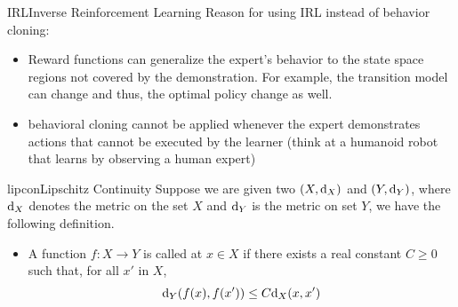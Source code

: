 \documentclass[9pt]{article}
\begin{document}
\begin{topic}{IRL}{Inverse Reinforcement Learning} 
Reason for using IRL instead of behavior cloning:
\begin{itemize}
\item Reward functions can generalize the expert's behavior to the state space regions not covered by the demonstration. For example, the transition model can change and thus, the optimal policy change as well. 
\item behavioral cloning cannot be applied whenever the expert demonstrates actions that cannot be executed by the
learner (think at a humanoid robot that learns by observing a human expert)
\end{itemize}
\end{topic}

\begin{topic}{lipcon}{Lipschitz Continuity}
Suppose we are given two  $(X,\mathrm{d}_X)$ and $(Y,\mathrm{d}_Y)$, where $\mathrm{d}_X$ denotes the metric on the set $X$ and $\mathrm{d}_Y$ is the metric on set $Y$, we have the following definition.
\begin{itemize}
\item A function $f:X\rightarrow Y$ is called  at $x\in X$ if there exists a real constant $C\geq 0$ such that, for all $x'$ in $X$,
\[
\mathrm{d}_Y(f(x), f(x')) \le C \mathrm{d}_X(x, x')
\]
\end{itemize}
\citep{Eriksson2013Applied}
\end{topic}
\end{document}
